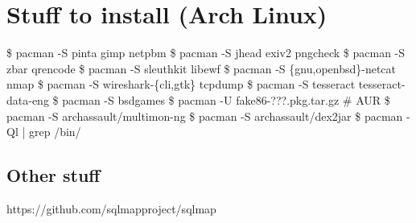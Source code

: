 \documentclass{refcard}
\begin{document}
\section{Stuff to install \hfill {\normalsize (Arch Linux)}}



\begin{ldesc}
	  \$ pacman -S pinta gimp netpbm
	    \$ pacman -S jhead exiv2 pngcheck
	\li[QR/Barcode]        \$ pacman -S zbar qrencode
	        \$ pacman -S sleuthkit libewf
	    \$ pacman -S \{gnu,openbsd\}-netcat nmap
	    \$ pacman -S wireshark-\{cli,gtk\} tcpdump
	\li[OCR]               \$ pacman -S tesseract tesseract-data-eng %
	\li[En/Decoding]       \$ pacman -S bsdgames
	\li[8086 emulator] \$ pacman -U fake86-???.pkg.tar.gz  \# AUR
	        \$ pacman -S archassault/multimon-ng
	\li[Android]           \$ pacman -S archassault/dex2jar
	   \$ pacman -Ql  | grep /bin/
\end{ldesc}

\subsection{Other stuff}
\begin{ldesc}
	\lI[SQLi]     https://github.com/sqlmapproject/sqlmap
\end{ldesc}
\end{document}
